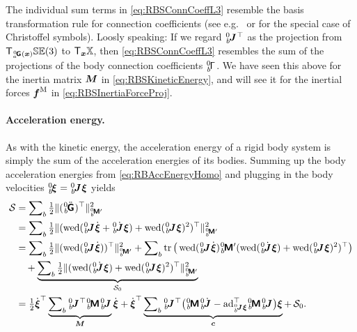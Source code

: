 The individual sum terms in \eqref{eq:RBSConnCoeffL3} resemble the basis transformation rule for connection coefficients (see e.g.\ \cite[Vol.\,2, p.\,221]{Spivak:DiffGeo} or \cite[p.\,145]{Abraham:FoundationsOfMechanics} for the special case of Christoffel symbols).
Loosly speaking: If we regard $\bodyJac{0}{\BidxII}^\top$ as the projection from $\Tangent[\bodyHomoCoord{0}{\BidxI}(\sysCoord)] \SpecialEuclideanGroup(3)$ to $\Tangent[\sysCoord]\configSpace$, then \eqref{eq:RBSConnCoeffL3} resembles the sum of the projections of the body connection coefficients $\bodyConnCoeffL{0}{\BidxII}{}{}{}$.
We have seen this above for the inertia matrix $\sysInertiaMat$ in \eqref{eq:RBSKineticEnergy}, and will see it for the inertial forces $\genForceInertia$ in \eqref{eq:RBSInertiaForceProj}.

\paragraph{Acceleration energy.}
As with the kinetic energy, the acceleration energy of a rigid body system is simply the sum of the acceleration energies of its bodies.
Summing up the body acceleration energies from \eqref{eq:RBAccEnergyHomo} and plugging in the body velocities $\bodyVel{0}{\BidxII} = \bodyJac{0}{\BidxII} \sysVel$ yields
\begin{align}\label{eq:RBSAccEnergy}
 \accEnergy
 &= \sumBodies \tfrac{1}{2} \norm[\bodyInertiaMatp{0}{\BidxII}]{(\bodyHomoCoorddd{0}{\BidxII})^\top}^2
\nonumber\\
 &= \sumBodies \tfrac{1}{2} \norm[\bodyInertiaMatp{0}{\BidxII}]{(\wedOp(\bodyJac{0}{\BidxII} \sysVeld + \bodyJacd{0}{\BidxII} \sysVel) + \wedOp(\bodyJac{0}{\BidxII} \sysVel)^2)^\top}^2
\nonumber\\
 &= \sumBodies \tfrac{1}{2} \norm[\bodyInertiaMatp{0}{\BidxII}]{(\wedOp(\bodyJac{0}{\BidxII} \sysVeld))^\top}^2
 + \sumBodies \tr\big( \wedOp(\bodyJac{0}{\BidxII} \sysVeld) \bodyInertiaMatp{0}{\BidxII} (\wedOp(\bodyJacd{0}{\BidxII} \sysVel) + \wedOp(\bodyJac{0}{\BidxII} \sysVel)^2)^\top \big)
\nonumber\\
 &\quad + \underbrace{\sumBodies \tfrac{1}{2} \norm[\bodyInertiaMatp{0}{\BidxII}]{(\wedOp(\bodyJacd{0}{\BidxII} \sysVel) + \wedOp(\bodyJac{0}{\BidxII} \sysVel)^2)^\top}^2}_{\accEnergy_0}
\nonumber\\
 &= \tfrac{1}{2} \sysVeld^\top \underbrace{\sumBodies \bodyJac{0}{\BidxII}^\top \bodyInertiaMat{0}{\BidxII} \bodyJac{0}{\BidxII}}_{\sysInertiaMat} \sysVeld
 + \sysVeld^\top \underbrace{\sumBodies \bodyJac{0}{\BidxII}^\top \big(\bodyInertiaMat{0}{\BidxII} \bodyJacd{0}{\BidxII} - \ad{\bodyJac{0}{\BidxII}\sysVel}^\top \bodyInertiaMat{0}{\BidxII}\bodyJac{0}{\BidxII} \big) \sysVel}_{\gyroForce}
 + \, \accEnergy_0.
\end{align}
